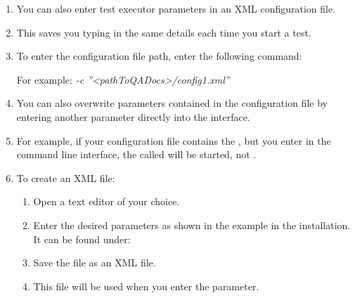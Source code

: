 
\begin{enumerate}
\item You can also enter test executor parameters in an XML configuration file.
\item This saves you typing in the same details each time you start a test.
\item To enter the configuration file path, enter the following command:\\

For example:
\emph{-c ''<pathToQADocs>/config1.xml''}
\item You can also overwrite parameters contained in the configuration file by entering another parameter directly into the interface. 
\item For example, if your configuration file contains the \gdsuite{} , but you enter  in the command line interface, the \gdsuite{} called  will be started, not .
\item To create an XML file:
\begin{enumerate} 
\item Open a text editor of your choice. 
\item Enter the desired parameters as shown in the example in the installation. It can be found under:\\
\item Save the file as an XML file.
\item This file will be used when you enter the  parameter.
\end{enumerate}
\end{enumerate}
